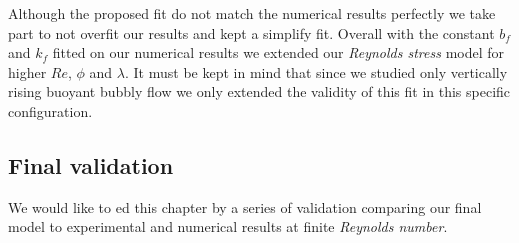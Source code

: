 Although the proposed fit do not match the numerical results perfectly we take part to not overfit our results and kept a simplify fit. 
Overall with the constant $b_f$ and $k_f$ fitted on our numerical results we extended our \textit{Reynolds stress} model for higher $Re$, $\phi$ and $\lambda$. 
It must be kept in mind that since we studied only vertically rising buoyant bubbly flow we only extended the validity of this fit in this specific configuration. 



\subsection{Final validation}

We would like to ed this chapter by a series of validation comparing our final model to experimental and numerical results at finite \textit{Reynolds number}. 

